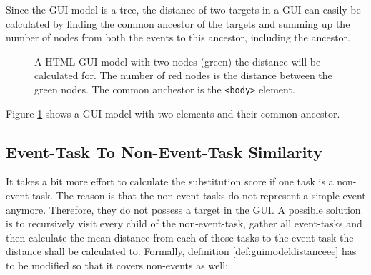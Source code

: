 Since the GUI model is a tree, the distance of two targets in a GUI can easily be calculated by finding the common ancestor of the targets and summing up the number of nodes from both the events to this ancestor, including the ancestor.
\begin{figure}
\begin{center}
\end{center}
\caption{A HTML GUI model with two nodes (green) the distance will be calculated for.  The number of red nodes is the distance between the green nodes. The common anchestor is the \texttt{<body>} element.}
\label{fig:guimodeldistance}

\end{figure}
Figure \ref{fig:guimodeldistance} shows a GUI model with two elements and their common ancestor.


\subsection{Event-Task To Non-Event-Task Similarity}
It takes a bit more effort to calculate the substitution score if one task is a non-event-task.
The reason is that the non-event-tasks do not represent a simple event anymore.
Therefore, they do not possess a target in the GUI.
A possible solution is to recursively visit every child of the non-event-task, gather all event-tasks and then calculate the mean distance from each of those tasks to the event-task the distance shall be calculated to.
Formally, definition \ref{def:guimodeldistanceee} has to be modified so that it covers non-events as well:

